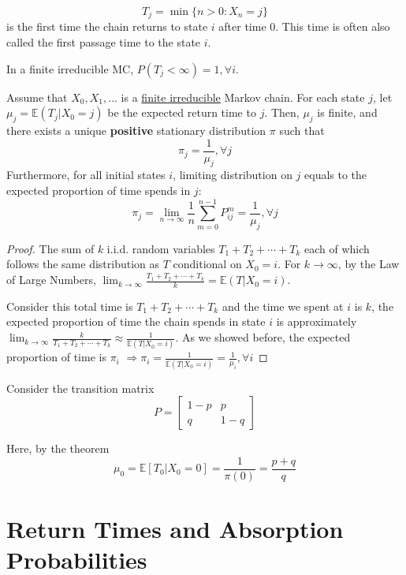 \documentclass[11pt]{elegantbook}
\begin{document}
$$T_j=\min\{n>0 : X_n = j\}$$ is the first time the chain returns to state $i$ after time $0$. This time is often also called the first passage time to the state $i$.

In a finite irreducible MC, $P(T_j<\infty)=1,\forall i$.
\begin{theorem}
    Assume that $X_0, X_1,...$ is a \underline{finite irreducible} Markov chain. For each state $j$, let $\mu_j = \mathbb{E}(T_j|X_0 = j)$ be the expected return time to $j$. Then, $\mu_j$ is finite, and there exists a unique \textbf{positive} stationary distribution $\pi$ such that $$\pi_j=\frac{1}{\mu_j},\forall j$$
    Furthermore, for all initial states $i$, limiting distribution on $j$ equals to the expected proportion of time spends in $j$: $$\pi_j=\lim_{n \rightarrow \infty}\frac{1}{n}\sum_{m=0}^{n-1}P_{ij}^m=\frac{1}{\mu_j},\forall j$$
\end{theorem}

\begin{proof}
    The sum of $k$ i.i.d. random variables $T_1+T_2+\cdots+T_k$ each of which follows the same distribution as $T$ conditional on $X_0=i$. For $k \rightarrow \infty$, by the Law of Large Numbers, $\lim_{k \rightarrow \infty}\frac{T_1+T_2+\cdots+T_k}{k} = \mathbb{E}(T|X_0=i)$.

    Consider this total time is $T_1+T_2+\cdots+T_k$ and the time we spent at $i$ is $k$, the expected proportion of time the chain spends in state $i$ is approximately $\lim_{k \rightarrow \infty}\frac{k}{T_1+T_2+\cdots+T_k}\approx \frac{1}{\mathbb{E}(T|X_0=i)}$. As we showed before, the expected proportion of time is $\pi_i$ $\Rightarrow \pi_i=\frac{1}{\mathbb{E}(T|X_0=i)}=\frac{1}{\mu_i},\forall i$
\end{proof}

\begin{example}
    Consider the transition matrix $$P=\begin{bmatrix}
        1-p&p\\
        q&1-q
    \end{bmatrix}$$
\end{example}
Here, by the theorem $$\mu_0=\mathbb{E}[T_0|X_0=0]=\frac{1}{\pi(0)}=\frac{p+q}{q}$$

\section{Return Times and Absorption Probabilities}
\end{document}
